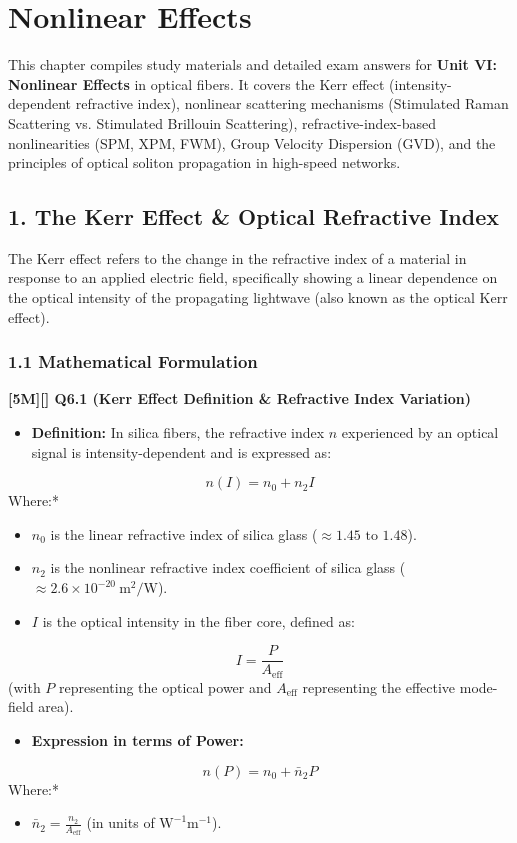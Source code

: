 \chapter{Nonlinear Effects}

This chapter compiles study materials and detailed exam answers for \textbf{Unit VI: Nonlinear Effects} in optical fibers. It covers the Kerr effect (intensity-dependent refractive index), nonlinear scattering mechanisms (Stimulated Raman Scattering vs. Stimulated Brillouin Scattering), refractive-index-based nonlinearities (SPM, XPM, FWM), Group Velocity Dispersion (GVD), and the principles of optical soliton propagation in high-speed networks.


\section{1. The Kerr Effect \& Optical Refractive Index}

The Kerr effect refers to the change in the refractive index of a material in response to an applied electric field, specifically showing a linear dependence on the optical intensity of the propagating lightwave (also known as the optical Kerr effect).

\subsection{1.1 Mathematical Formulation}
\textbf{[5M][] Q6.1 (Kerr Effect Definition \& Refractive Index Variation)}

\begin{itemize}
  \item   \textbf{Definition:} In silica fibers, the refractive index $n$ experienced by an optical signal is intensity-dependent and is expressed as:
\end{itemize}
    \[ n(I) = n_0 + n_2 I \]
    \textit{   }Where:*
\begin{itemize}
  \item   $n_0$ is the linear refractive index of silica glass ($\approx 1.45 \text{ to } 1.48$).
  \item   $n_2$ is the nonlinear refractive index coefficient of silica glass ($\approx 2.6 \times 10^{-20}\ \text{m}^2/\text{W}$).
  \item   $I$ is the optical intensity in the fiber core, defined as:
\end{itemize}
            \[ I = \frac{P}{A_{\text{eff}}} \]
            (with $P$ representing the optical power and $A_{\text{eff}}$ representing the effective mode-field area).
\begin{itemize}
  \item   \textbf{Expression in terms of Power:}
\end{itemize}
    \[ n(P) = n_0 + \bar{n}_2 P \]
    \textit{   }Where:*
\begin{itemize}
  \item   $\bar{n}_2 = \frac{n_2}{A_{\text{eff}}}$ (in units of $\text{W}^{-1}\text{m}^{-1}$).
\end{itemize}


